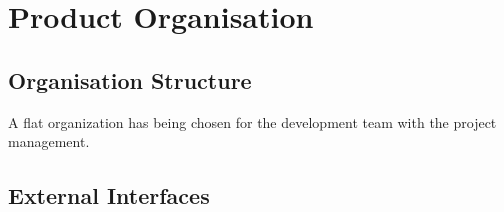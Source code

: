 
\chapter{Product Organisation} %

\label{Part6Chapter3} %



\section{Organisation Structure}
A flat organization has being chosen for the development team with the project management.



\section{External Interfaces}

